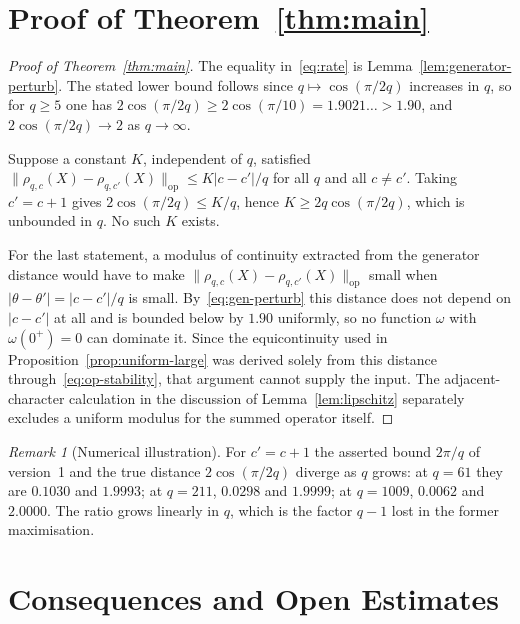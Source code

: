 \documentclass[12pt,a4paper]{article}
\theoremstyle{definition}
\theoremstyle{remark}
\newtheorem{remark}[theorem]{Remark}
\begin{document}
  \section{Proof of Theorem~\ref{thm:main}}\label{sec:proof}

    \begin{proof}[Proof of Theorem~\ref{thm:main}]
      The equality in~\eqref{eq:rate} is Lemma~\ref{lem:generator-perturb}.
      The stated lower bound follows since $q \mapsto \cos(\pi/2q)$ increases in $q$, so for
      $q \geq 5$ one has $2\cos(\pi/2q) \geq 2\cos(\pi/10) = 1.9021\ldots > 1.90$, and
      $2\cos(\pi/2q) \to 2$ as $q \to \infty$.

      Suppose a constant $K$, independent of $q$, satisfied
      $\|\rho_{q,c}(X) - \rho_{q,c'}(X)\|_{\mathrm{op}} \leq K|c-c'|/q$ for all $q$ and all
      $c \neq c'$.
      Taking $c' = c+1$ gives $2\cos(\pi/2q) \leq K/q$, hence $K \geq 2q\cos(\pi/2q)$, which
      is unbounded in $q$.
      No such $K$ exists.

      For the last statement, a modulus of continuity extracted from the generator distance
      would have to make $\|\rho_{q,c}(X) - \rho_{q,c'}(X)\|_{\mathrm{op}}$ small when
      $|\theta - \theta'| = |c-c'|/q$ is small.
      By~\eqref{eq:gen-perturb} this distance does not depend on $|c - c'|$ at all and is
      bounded below by $1.90$ uniformly, so no function $\omega$ with
      $\omega(0^+) = 0$ can dominate it.
      Since the equicontinuity used in Proposition~\ref{prop:uniform-large} was derived
      solely from this distance through~\eqref{eq:op-stability}, that argument cannot
      supply the input.
      The adjacent-character calculation in the discussion of Lemma~\ref{lem:lipschitz}
      separately excludes a uniform modulus for the summed operator itself.
    \end{proof}

    \begin{remark}[Numerical illustration]\label{rem:numerics}
      For $c' = c+1$ the asserted bound $2\pi/q$ of version~1 and the true distance
      $2\cos(\pi/2q)$ diverge as $q$ grows: at $q = 61$ they are $0.1030$ and $1.9993$; at
      $q = 211$, $0.0298$ and $1.9999$; at $q = 1009$, $0.0062$ and $2.0000$.
      The ratio grows linearly in $q$, which is the factor $q-1$ lost in the former
      maximisation.
    \end{remark}

  \section{Consequences and Open Estimates}\label{sec:consequences}
\end{document}
